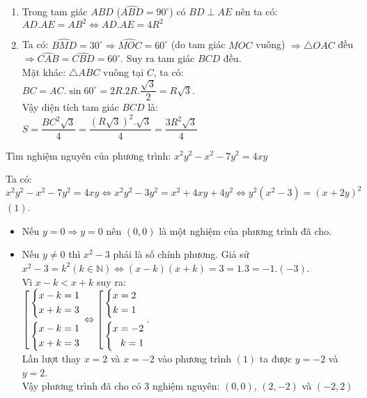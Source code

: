 \begin{ex}
{\begin{enumerate}
        \item Trong tam giác $ABD$ ($\widehat{ABD}=90^\circ$) có $BD\perp AE$ nên ta có: \\
        $AD.AE=AB^2\Leftrightarrow AD.AE=4R^2$
        \item Ta có: $\widehat{BMD}=30^\circ\Rightarrow \widehat{MOC}=60^\circ$ (do tam giác $MOC$ vuông) $\Rightarrow \triangle OAC$ đều $\Rightarrow \widehat{CAB}=\widehat{CBD}=60^\circ$. Suy ra tam giác $BCD$ đều.\\
        Mặt khác: $\triangle ABC$ vuông tại $C$, ta có: \\
        $BC=AC.\sin 60^\circ=2R.2R.\dfrac{\sqrt{3}}{2}=R\sqrt{3}$.\\
        Vậy diện tích tam giác $BCD$ là: \\
        $S=\dfrac{BC^2\sqrt{3}}{4}=\dfrac{(R\sqrt{3})^2.\sqrt{3}}{4}=\dfrac{3R^2\sqrt{3}}{4}$
    \end{enumerate}
    }
\end{ex}

\begin{ex}%
    Tìm nghiệm nguyên của phương trình: $x^2y^2-x^2-7y^2=4xy$
\loigiai
    {Ta có: 
   $x^2y^2-x^2-7y^2=4xy\Leftrightarrow x^2y^2-3y^2=x^2+4xy+4y^2\Leftrightarrow y^2(x^2-3)=(x+2y)^2$ $(1)$.
   \begin{itemize}
   	\item Nếu $y=0\Rightarrow y=0$ nên $(0,0)$ là một nghiệm của phương trình đã cho.
   	\item Nếu $y\neq 0$ thì $x^2-3$ phải là số chính phương. Giả sử $x^2-3=k^2(k\in \mathbb{N})\Leftrightarrow (x-k)(x+k)=3=1.3=-1.(-3)$.\\
   	Vì $x-k<x+k$ suy ra: \\
  $\left[\begin{aligned}&\left\{\begin{aligned}x-k=1\\x+k=3\end{aligned}\right.\\ &\left\{\begin{aligned}x-k=1\\x+k=3\end{aligned}\right.\end{aligned}\right.\Leftrightarrow \left[\begin{aligned}&\left\{\begin{aligned}x=2\\k=1\end{aligned}\right.\\ &\left\{\begin{aligned}x=-2\\k=1\end{aligned}\right.\end{aligned}\right.$.\\
  Lần lượt thay $x=2$ và $x=-2$ vào phương trình $(1)$ ta được $y=-2$ và $y=2$.\\
  Vậy phương trình đã cho có 3 nghiệm nguyên: $(0,0)$, $(2,-2)$ và $(-2,2)$
   \end{itemize}
    }
\end{ex}

